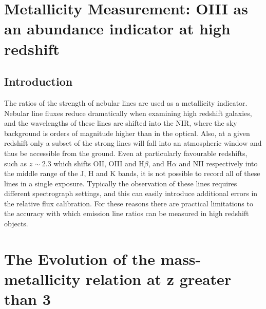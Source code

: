 \documentclass{literature}
\begin{document}
	
\section{Metallicity Measurement: OIII as an abundance indicator at high redshift}
\subsection{Introduction}
The ratios of the strength of nebular lines are used as a metallicity indicator. Nebular line fluxes reduce dramatically when examining high redshift galaxies, and the wavelengths of these lines are shifted into the NIR, where the sky background is orders of magnitude higher than in the optical. Also, at a given redshift only a subset of the strong lines will fall into an atmospheric window and thus be accessible from the ground. Even at particularly favourable redshifts, such as $z\sim2.3$ which shifts OII, OIII and H$\beta$, and H$\alpha$ and NII respectively into the middle range of the J, H and K bands, it is not possible to record all of these lines in a single exposure. Typically the observation of these lines requires different spectrograph settings, and this can easily introduce additional errors in the relative flux calibration. For these reasons there are practical limitations to the accuracy with which emission line ratios can be measured in high redshift objects.   








\section{The Evolution of the mass-metallicity relation at z greater than 3}\label{sec:maiolino metallicity paper}
\end{document}
